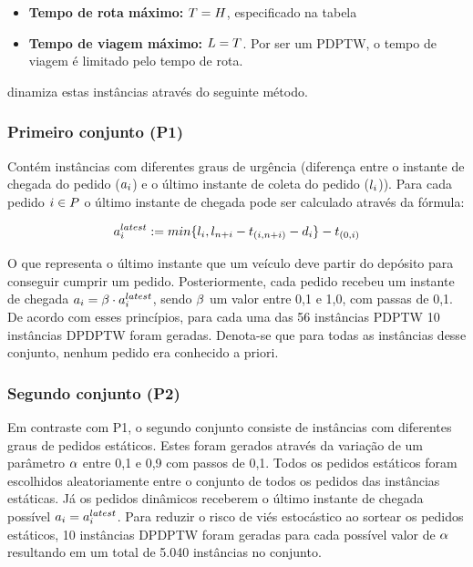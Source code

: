 \documentclass{anpet}
\begin{document}
\begin{itemize}
\begin{itemize}
    \end{itemize}
    \item \textbf{Tempo de rota máximo:} $T = H$, especificado na tabela
    \item \textbf{Tempo de viagem máximo:} $L = T$. Por ser um PDPTW, o tempo de viagem é limitado pelo tempo de rota.
\end{itemize}



\textcite{pankratz_dynamic_2005} dinamiza estas instâncias através do seguinte método.

\subsubsection{Primeiro conjunto (P1)}
Contém instâncias com diferentes graus de urgência (diferença entre o instante de chegada do pedido ($a_i$) e o último instante de coleta do pedido ($l_i{}$)). Para cada pedido $i{} \in P$ o último instante de chegada pode ser calculado através da fórmula:

\begin{equation}
    a{}_{i{}}^{latest} := min\{l_i{}, l_{n{} + i{}} - t_{(i{},{n{} + i{}})} - d_i{}\} - t_{(0,i{})}
    \label{eq:pankratz_dynamic_2005_requestLatestArrivalTime}
\end{equation}

O que representa o último instante que um veículo deve partir do depósito para conseguir cumprir um pedido. Posteriormente, cada pedido recebeu um instante de chegada $a_i = \beta \cdot a{}_{i{}}^{latest}$, sendo $\beta$ um valor entre 0,1 e 1,0, com passas de 0,1. De acordo com esses princípios, para cada uma das 56 instâncias PDPTW 10 instâncias DPDPTW foram geradas. Denota-se que para todas as instâncias desse conjunto, nenhum pedido era conhecido a priori.

\subsubsection{Segundo conjunto (P2)}
Em contraste com P1, o segundo conjunto consiste de instâncias com diferentes graus de pedidos estáticos. Estes foram gerados através da variação de um parâmetro $\alpha$ entre 0,1 e 0,9 com passos de 0,1. Todos os pedidos estáticos foram escolhidos aleatoriamente entre o conjunto de todos os pedidos das instâncias estáticas. Já os pedidos dinâmicos receberem o último instante de chegada possível $a_i = a{}_{i{}}^{latest}$. Para reduzir o risco de viés estocástico ao sortear os pedidos estáticos, 10 instâncias DPDPTW foram geradas para cada possível valor de $\alpha$ resultando em um total de 5.040 instâncias no conjunto.

\printbibliography
\end{document}
